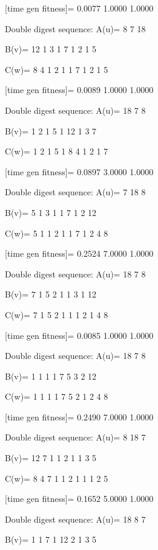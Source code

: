 [time gen fitness]=
    0.0077    1.0000    1.0000

Double digest sequence:
A(u)=
     8     7    18

B(v)=
    12     1     3     1     7     1     2     1     5

C(w)=
     8     4     1     2     1     1     7     1     2     1     5

[time gen fitness]=
    0.0089    1.0000    1.0000

Double digest sequence:
A(u)=
    18     7     8

B(v)=
     1     2     1     5     1    12     1     3     7

C(w)=
     1     2     1     5     1     8     4     1     2     1     7

[time gen fitness]=
    0.0897    3.0000    1.0000

Double digest sequence:
A(u)=
     7    18     8

B(v)=
     5     1     3     1     1     7     1     2    12

C(w)=
     5     1     1     2     1     1     7     1     2     4     8

[time gen fitness]=
    0.2524    7.0000    1.0000

Double digest sequence:
A(u)=
    18     7     8

B(v)=
     7     1     5     2     1     1     3     1    12

C(w)=
     7     1     5     2     1     1     1     2     1     4     8

[time gen fitness]=
    0.0085    1.0000    1.0000

Double digest sequence:
A(u)=
    18     7     8

B(v)=
     1     1     1     1     7     5     3     2    12

C(w)=
     1     1     1     1     7     5     2     1     2     4     8

[time gen fitness]=
    0.2490    7.0000    1.0000

Double digest sequence:
A(u)=
     8    18     7

B(v)=
    12     7     1     1     2     1     1     3     5

C(w)=
     8     4     7     1     1     2     1     1     1     2     5

[time gen fitness]=
    0.1652    5.0000    1.0000

Double digest sequence:
A(u)=
    18     8     7

B(v)=
     1     1     7     1    12     2     1     3     5

